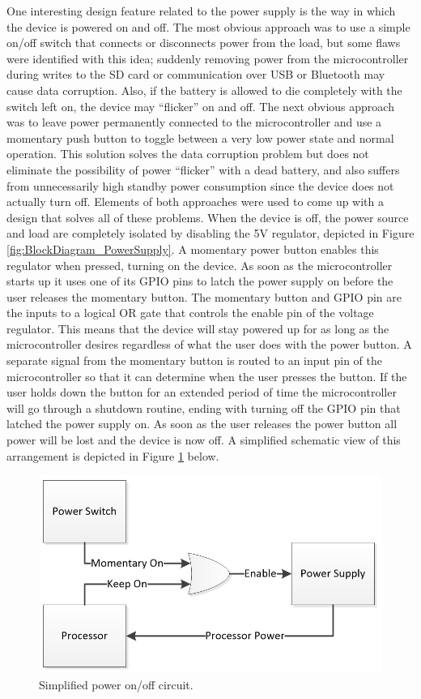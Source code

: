 One interesting design feature related to the power supply is the way in which 
the device is powered on and off. The most obvious approach was to use a simple 
on/off switch that connects or disconnects power from the load, but some flaws 
were identified with this idea; suddenly removing power from the microcontroller 
during writes to the SD card or communication over USB or Bluetooth may cause 
data corruption. Also, if the battery is allowed to die completely with the 
switch left on, the device may “flicker” on and off. The next obvious approach was to leave power permanently 
connected to the microcontroller and use a momentary push button to toggle 
between a very low power state and normal operation. This solution solves the 
data corruption problem but does not eliminate the possibility of power 
“flicker” with a dead battery, and also suffers from unnecessarily high standby 
power consumption since the device does not actually turn off. Elements of both 
approaches were used to come up with a design that solves all of these problems. 
When the device is off, the power source and load are completely isolated by 
disabling the 5V regulator, depicted in Figure \ref{fig:BlockDiagram_PowerSupply}. 
A momentary power button enables this regulator when pressed, turning on the 
device. As soon as the microcontroller starts up it uses one of its GPIO pins to 
latch the power supply on before the user releases the momentary button. The 
momentary button and GPIO pin are the inputs to a logical OR gate that controls 
the enable pin of the voltage regulator. This means that the device will stay 
powered up for as long as the microcontroller desires regardless of what the 
user does with the power button. A separate signal from the momentary button is 
routed to an input pin of the microcontroller so that it can determine when the 
user presses the button. If the user holds down the button for an extended period 
of time the microcontroller will go through a shutdown routine, ending with turning 
off the GPIO pin that latched the power supply on. As soon as the user releases 
the power button all power will be lost and the device is now off. A simplified 
schematic view of this arrangement is depicted in 
Figure \ref{fig:BlockDiagram_OnOff} below.

\begin{figure}[!htb]
\centering
\includegraphics[width=\textwidth]{images/BlockDiagram_OnOff.png}
\caption{Simplified power on/off circuit.}
\label{fig:BlockDiagram_OnOff}
\end{figure}

